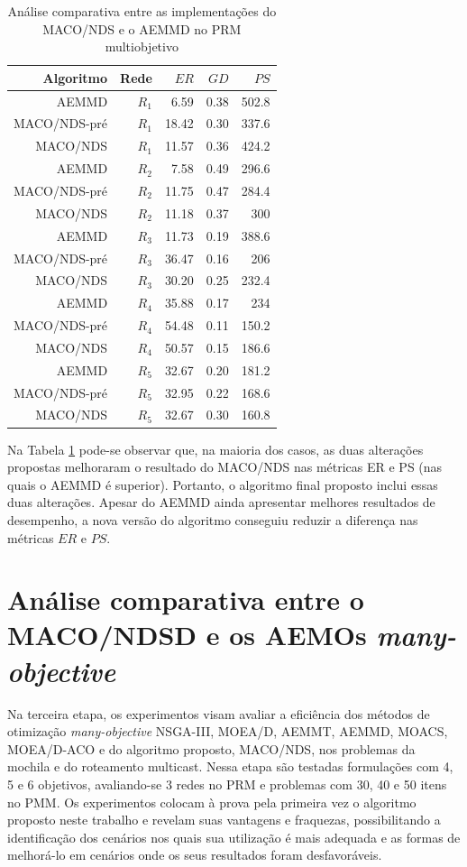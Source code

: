 \begin{table}[!htbp]
	\centering
	\caption{Análise comparativa entre as implementações do MACO/NDS e o AEMMD no PRM multiobjetivo}
	\label{tab_exp2_macod_simples}
	\begin{tabular}{rrrrr}
		Algoritmo  & Rede  & $ER$  & $GD$ & $PS$  \\ \hline
		AEMMD      & $R_1$ & 6.59  & 0.38 & 502.8 \\
		MACO/NDS-pré & $R_1$ & 18.42 & 0.30 & 337.6 \\
		MACO/NDS     & $R_1$ & 11.57 & 0.36 & 424.2 \\ \hline
		AEMMD      & $R_2$ & 7.58  & 0.49 & 296.6 \\
		MACO/NDS-pré & $R_2$ & 11.75 & 0.47 & 284.4 \\
		MACO/NDS     & $R_2$ & 11.18 & 0.37 & 300   \\ \hline
		AEMMD      & $R_3$ & 11.73 & 0.19 & 388.6 \\
		MACO/NDS-pré & $R_3$ & 36.47 & 0.16 & 206   \\
		MACO/NDS     & $R_3$ & 30.20 & 0.25 & 232.4 \\ \hline
		AEMMD      & $R_4$ & 35.88 & 0.17 & 234   \\
		MACO/NDS-pré & $R_4$ & 54.48 & 0.11 & 150.2 \\
		MACO/NDS     & $R_4$ & 50.57 & 0.15 & 186.6 \\ \hline
		AEMMD      & $R_5$ & 32.67 & 0.20 & 181.2 \\
		MACO/NDS-pré & $R_5$ & 32.95 & 0.22 & 168.6 \\
		MACO/NDS     & $R_5$ & 32.67 & 0.30 & 160.8
	\end{tabular}
\end{table}

Na Tabela \ref{tab_exp2_macod_simples} pode-se observar que, na maioria dos casos, as duas alterações propostas melhoraram o resultado do MACO/NDS nas métricas ER e PS (nas quais o AEMMD é superior). Portanto, o algoritmo final proposto inclui essas duas alterações. Apesar do AEMMD ainda apresentar melhores resultados de desempenho, a nova versão do algoritmo conseguiu reduzir a diferença nas métricas $ER$ e $PS$.

\section{Análise comparativa entre o MACO/NDSD e os AEMOs \textit{many-objective}}
\label{section_experimentos_etapa3}

Na terceira etapa, os experimentos visam avaliar a eficiência dos métodos de otimização \textit{many-objective} NSGA-III, MOEA/D, AEMMT, AEMMD, MOACS, MOEA/D-ACO e do algoritmo proposto, MACO/NDS, nos problemas da mochila e do roteamento multicast. Nessa etapa são testadas formulações com 4, 5 e 6 objetivos, avaliando-se 3 redes no PRM e problemas com 30, 40 e 50 itens no PMM. Os experimentos colocam à prova pela primeira vez o algoritmo proposto neste trabalho e revelam suas vantagens e fraquezas, possibilitando a identificação dos cenários nos quais sua utilização é mais adequada e as formas de melhorá-lo em cenários onde os seus resultados foram desfavoráveis.

